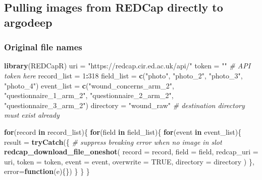 \documentclass[]{book}
\newenvironment{Shaded}{\begin{snugshade}}{\end{snugshade}}
\newcommand{\CommentTok}[1]{\textcolor[rgb]{0.56,0.35,0.01}{\textit{#1}}}
\newcommand{\ControlFlowTok}[1]{\textcolor[rgb]{0.13,0.29,0.53}{\textbf{#1}}}
\newcommand{\DataTypeTok}[1]{\textcolor[rgb]{0.13,0.29,0.53}{#1}}
\newcommand{\DecValTok}[1]{\textcolor[rgb]{0.00,0.00,0.81}{#1}}
\newcommand{\KeywordTok}[1]{\textcolor[rgb]{0.13,0.29,0.53}{\textbf{#1}}}
\newcommand{\NormalTok}[1]{#1}
\newcommand{\OperatorTok}[1]{\textcolor[rgb]{0.81,0.36,0.00}{\textbf{#1}}}
\newcommand{\OtherTok}[1]{\textcolor[rgb]{0.56,0.35,0.01}{#1}}
\newcommand{\StringTok}[1]{\textcolor[rgb]{0.31,0.60,0.02}{#1}}
\begin{document}
\hypertarget{pulling-images-from-redcap-directly-to-argodeep}{%
\subsection{Pulling images from REDCap directly to argodeep}\label{pulling-images-from-redcap-directly-to-argodeep}}

\hypertarget{original-file-names}{%
\subsubsection{Original file names}\label{original-file-names}}

\begin{Shaded}
\begin{Highlighting}[]
\KeywordTok{library}\NormalTok{(REDCapR)}
\NormalTok{uri =}\StringTok{ "https://redcap.cir.ed.ac.uk/api/"}
\NormalTok{token =}\StringTok{ ""} \CommentTok{# API token here}
\NormalTok{record_list =}\StringTok{ }\DecValTok{1}\OperatorTok{:}\DecValTok{318}
\NormalTok{field_list =}\StringTok{ }\KeywordTok{c}\NormalTok{(}\StringTok{"photo"}\NormalTok{, }\StringTok{"photo_2"}\NormalTok{, }\StringTok{"photo_3"}\NormalTok{, }\StringTok{"photo_4"}\NormalTok{)}
\NormalTok{event_list =}\StringTok{ }\KeywordTok{c}\NormalTok{(}\StringTok{"wound_concerns_arm_2"}\NormalTok{, }\StringTok{"questionnaire_1_arm_2"}\NormalTok{,}
               \StringTok{"questionnaire_2_arm_2"}\NormalTok{, }\StringTok{"questionnaire_3_arm_2"}\NormalTok{)}
\NormalTok{directory =}\StringTok{ "wound_raw"} \CommentTok{# destination directory must exist already}


\ControlFlowTok{for}\NormalTok{(record }\ControlFlowTok{in}\NormalTok{ record_list)\{}
  \ControlFlowTok{for}\NormalTok{(field }\ControlFlowTok{in}\NormalTok{ field_list)\{}
    \ControlFlowTok{for}\NormalTok{(event }\ControlFlowTok{in}\NormalTok{ event_list)\{}
\NormalTok{      result =}\StringTok{ }
\StringTok{        }\KeywordTok{tryCatch}\NormalTok{(\{      }\CommentTok{# suppress breaking error when no image in slot}
          \KeywordTok{redcap_download_file_oneshot}\NormalTok{(}
            \DataTypeTok{record        =}\NormalTok{ record,}
            \DataTypeTok{field         =}\NormalTok{ field,}
            \DataTypeTok{redcap_uri    =}\NormalTok{ uri,}
            \DataTypeTok{token         =}\NormalTok{ token,}
            \DataTypeTok{event         =}\NormalTok{ event,}
            \DataTypeTok{overwrite     =} \OtherTok{TRUE}\NormalTok{,}
            \DataTypeTok{directory     =}\NormalTok{ directory}
\NormalTok{          )}
\NormalTok{        \}, }\DataTypeTok{error=}\ControlFlowTok{function}\NormalTok{(e)\{\})}
\NormalTok{    \}}
\NormalTok{  \}}
\NormalTok{\}}
\end{Highlighting}
\end{Shaded}
\end{document}
